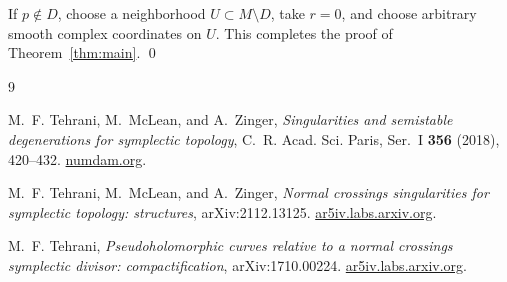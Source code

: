 \documentclass[11pt]{article}
\theoremstyle{definition}
\theoremstyle{remark}
\begin{document}
If \(p\notin D\), choose a neighborhood \(U\subset M\setminus D\), take \(r=0\),
and choose arbitrary smooth complex coordinates on \(U\). This completes the
proof of Theorem~\ref{thm:main}. \qed

\begin{thebibliography}{9}

M.~F. Tehrani, M.~McLean, and A.~Zinger,
\emph{Singularities and semistable degenerations for symplectic topology},
C.~R. Acad. Sci. Paris, Ser.~I \textbf{356} (2018), 420--432.
\href{https://www.numdam.org/item/10.1016/j.crma.2018.02.009.pdf}{numdam.org}.


M.~F. Tehrani, M.~McLean, and A.~Zinger,
\emph{Normal crossings singularities for symplectic topology: structures},
arXiv:2112.13125.
\href{https://ar5iv.labs.arxiv.org/html/2112.13125}{ar5iv.labs.arxiv.org}.


M.~F. Tehrani,
\emph{Pseudoholomorphic curves relative to a normal crossings symplectic
divisor: compactification},
arXiv:1710.00224.
\href{https://ar5iv.labs.arxiv.org/html/1710.00224}{ar5iv.labs.arxiv.org}.


\end{thebibliography}
\end{document}
